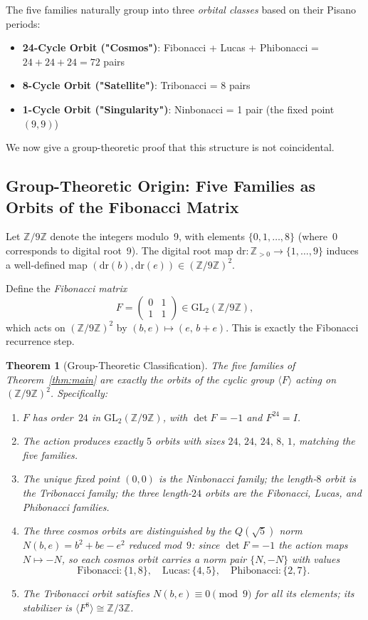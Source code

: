 \documentclass[12pt]{article}
\newtheorem{theorem}{Theorem}
\begin{document}
The five families naturally group into three \emph{orbital classes} based on their Pisano periods:

\begin{itemize}
\item \textbf{24-Cycle Orbit ("Cosmos")}: Fibonacci + Lucas + Phibonacci = $24 + 24 + 24 = 72$ pairs
\item \textbf{8-Cycle Orbit ("Satellite")}: Tribonacci = 8 pairs
\item \textbf{1-Cycle Orbit ("Singularity")}: Ninbonacci = 1 pair (the fixed point $(9,9)$)
\end{itemize}

We now give a group-theoretic proof that this structure is not coincidental.

\subsection{Group-Theoretic Origin: Five Families as Orbits of the Fibonacci Matrix}

Let $\mathbb{Z}/9\mathbb{Z}$ denote the integers modulo~9, with elements $\{0,1,\ldots,8\}$ (where~$0$ corresponds to digital root~9).  The digital root map $\mathrm{dr}:\mathbb{Z}_{>0}\to\{1,\ldots,9\}$ induces a well-defined map $(\mathrm{dr}(b),\mathrm{dr}(e))\in(\mathbb{Z}/9\mathbb{Z})^2$.

Define the \emph{Fibonacci matrix}
\[
  F = \begin{pmatrix} 0 & 1 \\ 1 & 1 \end{pmatrix} \in \mathrm{GL}_2(\mathbb{Z}/9\mathbb{Z}),
\]
which acts on $(\mathbb{Z}/9\mathbb{Z})^2$ by $(b,e)\mapsto (e,\, b+e)$.  This is exactly the Fibonacci recurrence step.

\begin{theorem}[Group-Theoretic Classification]\label{thm:orbits}
The five families of Theorem~\ref{thm:main} are exactly the orbits of the cyclic group $\langle F\rangle$ acting on $(\mathbb{Z}/9\mathbb{Z})^2$.  Specifically:
\begin{enumerate}
\item $F$ has order~$24$ in $\mathrm{GL}_2(\mathbb{Z}/9\mathbb{Z})$, with $\det F = -1$ and $F^{24} = I$.
\item The action produces exactly $5$ orbits with sizes $24,\,24,\,24,\,8,\,1$, matching the five families.
\item The unique fixed point $(0,0)$ is the Ninbonacci family; the length-$8$ orbit is the Tribonacci family; the three length-$24$ orbits are the Fibonacci, Lucas, and Phibonacci families.
\item The three cosmos orbits are distinguished by the \emph{$Q(\sqrt{5})$ norm} $N(b,e)=b^2+be-e^2$ reduced mod~$9$: since $\det F=-1$ the action maps $N\mapsto -N$, so each cosmos orbit carries a norm pair $\{N,-N\}$ with values
\[
  \text{Fibonacci}: \{1,8\},\quad \text{Lucas}: \{4,5\},\quad \text{Phibonacci}: \{2,7\}.
\]
\item The Tribonacci orbit satisfies $N(b,e)\equiv 0\pmod{9}$ for all its elements; its stabilizer is $\langle F^8\rangle\cong\mathbb{Z}/3\mathbb{Z}$.
\end{enumerate}
\end{theorem}
\end{document}
